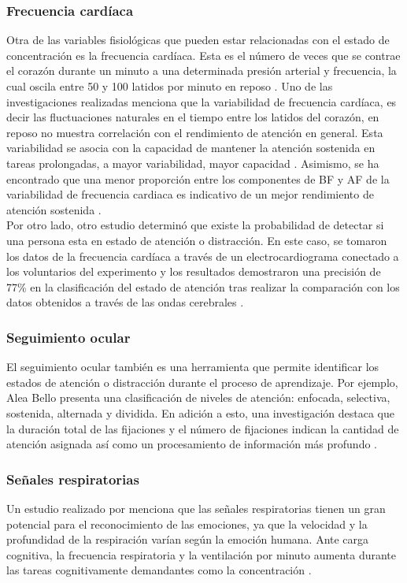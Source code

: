 \subsubsection{Frecuencia cardíaca}
Otra de las variables fisiológicas que pueden estar relacionadas con el estado de concentración es la frecuencia cardíaca. Esta es el número de veces que se contrae el corazón durante un minuto a una determinada presión arterial y frecuencia, la cual oscila entre 50 y 100 latidos por minuto en reposo \autocite{2.frecuencia1}. Uno de las investigaciones realizadas menciona que la variabilidad de frecuencia cardíaca, es decir las fluctuaciones naturales en el tiempo entre los latidos del corazón, en reposo no muestra correlación con el rendimiento de atención en general. Esta variabilidad se asocia con la capacidad de mantener la atención sostenida en tareas prolongadas, a mayor variabilidad, mayor capacidad \autocite{2.frecuencia2}. Asimismo, se ha encontrado que una menor proporción entre los componentes de  \ac{BF} y  \ac{AF} de la variabilidad de frecuencia cardiaca es indicativo de un mejor rendimiento de atención sostenida \autocite{2.frecuencia3}.\\

Por otro lado,  otro estudio determinó que existe la probabilidad de detectar si una persona esta en estado de atención o distracción. En este caso, se tomaron los datos de la frecuencia cardíaca a través de un electrocardiograma conectado a los voluntarios del experimento y los resultados demostraron una precisión de 77\% en la clasificación del estado de atención tras realizar la comparación con los datos obtenidos a través de las ondas cerebrales \autocite{2.electrocardiograma}. 

\subsubsection{Seguimiento ocular}
El seguimiento ocular también es una herramienta que permite identificar los estados de atención o distracción durante el proceso de aprendizaje. Por ejemplo, Alea Bello \textcite{2.clasificacionOcular} presenta una clasificación de niveles de atención: enfocada, selectiva, sostenida, alternada y dividida. En adición a esto, una investigación destaca que la duración total de las fijaciones y el número de fijaciones indican la cantidad de atención asignada así como un procesamiento de información más profundo \autocite{2.ocular2}.

\subsubsection{Señales respiratorias}
Un estudio realizado por \textcite{2.Señalrespiracion1} menciona que las señales respiratorias tienen un gran potencial para el reconocimiento de las emociones, ya que la velocidad y la profundidad de la respiración varían según la emoción humana. Ante carga cognitiva, la frecuencia respiratoria y la ventilación por minuto aumenta durante las tareas cognitivamente demandantes como la concentración \autocite{2.Señalrespiracion2}.\\



